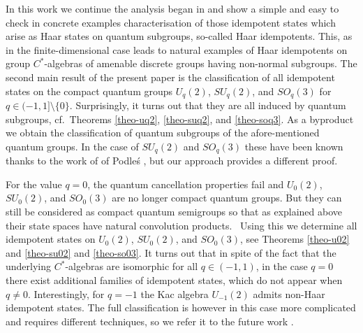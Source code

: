 \documentclass[12pt]{amsart}
\theoremstyle{definition}
\theoremstyle{remark}
\numberwithin{equation}{section}
\begin{document}
In this work we continue the analysis began in \cite{franz+skalski08a} and show a simple and easy to check in concrete examples characterisation of those idempotent
states which arise as Haar states on quantum subgroups, so-called Haar idempotents. This, as in the finite-dimensional case leads to natural examples of Haar idempotents on group $C^*$-algebras of amenable discrete groups having non-normal subgroups. The second main result of the present paper is the
classification of all idempotent states on the compact quantum groups $U_q(2)$, $SU_q(2)$, and $SO_q(3)$ for $q \in
(-1,1]\setminus \{0\}$. Surprisingly, it turns out that they are all induced by quantum subgroups, cf.\ Theorems \ref{theo-uq2},
\ref{theo-suq2}, and \ref{theo-soq3}. As a byproduct we obtain the classification of quantum subgroups of the afore-mentioned
quantum groups. In the case of $SU_q(2)$ and $SO_q(3)$ these have been known thanks to the work of  of Podle\'s \cite{podles95}, but our approach provides a different proof.

For the value $q=0$, the quantum cancellation properties fail and $U_0(2)$, $SU_0(2)$, and $SO_0(3)$ are no 
longer compact quantum groups. But they can still be considered as compact quantum semigroups so that as 
explained above their state spaces have natural convolution products. \ Using this we determine all idempotent 
states on $U_0(2)$, $SU_0(2)$, and $SO_0(3)$, see Theorems \ref{theo-u02} and \ref{theo-su02} and 
\ref{theo-so03}. It turns out that in spite of the fact that the underlying $C^*$-algebras are isomorphic for all 
$q \in(-1,1)$, in the case $q=0$ there exist additional families of idempotent states, which do not appear when 
$q\not=0$. Interestingly, for $q=-1$ the Kac algebra $U_{-1}(2)$ admits non-Haar idempotent states. The full 
classification is however in this case more complicated and requires different techniques, so we refer it to the 
future work \cite{franz+skalski+tomatsu10}.
\end{document}
